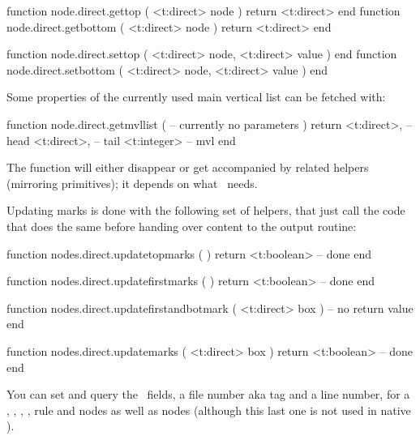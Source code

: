\starttyping[option=LUA]
function node.direct.gettop    ( <t:direct> node ) return <t:direct> end
function node.direct.getbottom ( <t:direct> node ) return <t:direct> end

function node.direct.settop    ( <t:direct> node, <t:direct> value ) end
function node.direct.setbottom ( <t:direct> node, <t:direct> value ) end
\stoptyping

%

\stopsubsection

\startsubsection[title={MVL}]

Some properties of the currently used main vertical list can be fetched with:

\starttyping[option=LUA]
function node.direct.getmvllist (
    -- currently no parameters
)
    return
        <t:direct>,  -- head
        <t:direct>,  -- tail
        <t:integer> -- mvl
end
\stoptyping

\stopsubsection

\startsubsection[title={Balancing}]

The  function will either disappear or get accompanied
by related helpers (mirroring primitives); it depends on what \CONTEXT\ needs.

Updating marks is done with the following set of helpers, that just call the code
that does the same before handing over content to the output routine:

\starttyping[option=LUA]
function nodes.direct.updatetopmarks ( )
    return <t:boolean> -- done
end

function nodes.direct.updatefirstmarks ( )
    return <t:boolean> -- done
end

function nodes.direct.updatefirstandbotmark ( <t:direct> box )
    -- no return value
end

function nodes.direct.updatemarks ( <t:direct> box )
    return <t:boolean> -- done
end
\stoptyping

\stopsubsection

\startsubsection[title={\SYNCTEX}]

You can set and query the \SYNCTEX\ fields, a file number aka tag and a line
number, for a , , , , \type
{rule} and  nodes as well as  nodes (although this last
one is not used in native \SYNCTEX).

